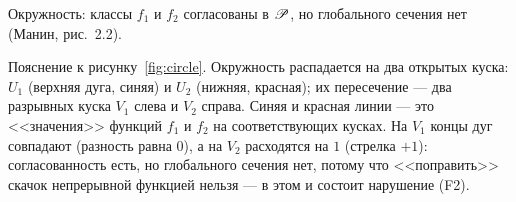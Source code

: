 \begin{risunok}{Окружность: классы $f_1$ и $f_2$ согласованы в
 $\mathscr{P}$, но глобального сечения нет (Манин, рис.~2.2).
  \label{fig:circle}}
\end{risunok}

Пояснение к рисунку~\ref{fig:circle}. Окружность распадается на
два открытых куска: $U_1$ (верхняя дуга, синяя) и $U_2$ (нижняя,
красная); их пересечение --- два разрывных куска $V_1$ слева и
$V_2$ справа. Синяя и красная линии --- это <<значения>> функций
$f_1$ и $f_2$ на соответствующих кусках. На $V_1$ концы дуг
совпадают (разность равна $0$), а на $V_2$ расходятся на $1$
(стрелка $+1$): согласованность есть, но глобального сечения
нет, потому что <<поправить>> скачок непрерывной функцией
нельзя --- в этом и состоит нарушение (F2).

